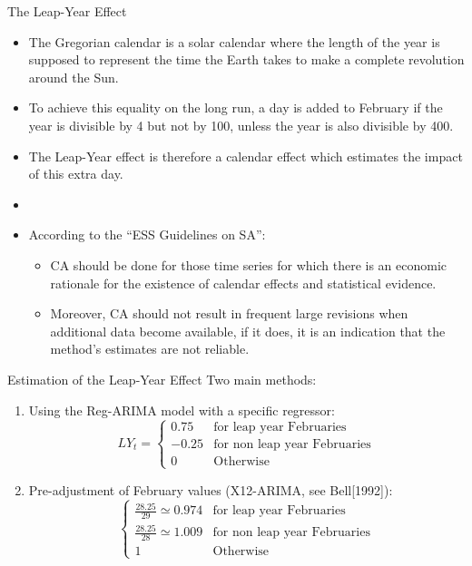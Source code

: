 \documentclass[10pt, handout]{beamer}
\begin{document}
\begin{frame}{The Leap-Year Effect}
 \begin{itemize}
  \item The Gregorian calendar is a solar calendar where the length of the year is supposed to represent the time the Earth takes to make a complete revolution around the Sun. 
	\item To achieve this equality on the long run, a day is added to February if the year is divisible by 4 but not by 100, unless the year is also divisible by 400.
  \item The Leap-Year effect is therefore a calendar effect which estimates the impact of this extra day.
	\item[]
	\item<2-> According to the ``ESS Guidelines on SA'':
    \begin{itemize}
	     \item<2-> CA should be done for those time series for which there is an economic rationale for the existence of calendar effects and statistical evidence. 
	     \item<2-> Moreover, CA should not result in frequent large revisions when additional data become available, if it does, it is an indication that the method's estimates are not reliable.
    \end{itemize}
 \end{itemize}
\end{frame}

\begin{frame}{Estimation of the Leap-Year Effect}
Two main methods:
\begin{enumerate}
\item<1-> Using the Reg-ARIMA model with a specific regressor:
\[
LY_t = \begin{cases}
0.75 & \text{for leap year Februaries} \\
-0.25  & \text{for non leap year Februaries} \\
0 & \text{Otherwise}
\end{cases}
\]
\item<2-> Pre-adjustment of February values (X12-ARIMA, see Bell[1992]): 
\[\begin{cases}
\frac{28.25}{29} \simeq 0.974 & \text{for leap year Februaries} \\
\frac{28.25}{28} \simeq 1.009 & \text{for non leap year Februaries} \\
1 & \text{Otherwise}
\end{cases}
\]
\end{enumerate}
\end{frame}
\end{document}
